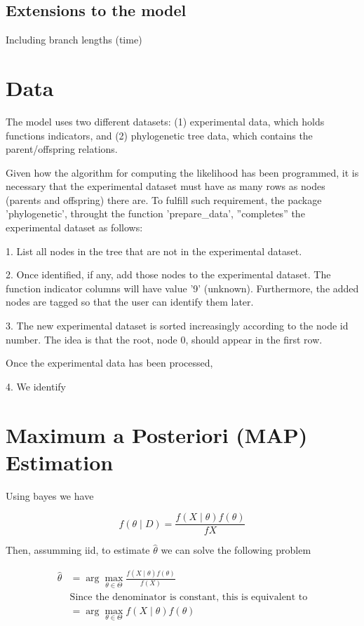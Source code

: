 \documentclass[12pt]{article}
\newcommand{\f}[1]{{f\left(#1\right) }}
\newcommand{\fcond}[2]{{f\left(#1\;|\;#2\right) }}
\begin{document}
\subsection{Extensions to the model}

Including branch lengths (time)

\appendix

\section{Data}

The model uses two different datasets: (1) experimental data, which holds functions indicators, and (2) phylogenetic tree data, which contains the parent/offspring relations.

Given how the algorithm for computing the likelihood has been programmed, it is necessary that the experimental dataset must have as many rows as nodes (parents and offspring) there are. To fulfill such requirement, the package 'phylogenetic', throught the function 'prepare\_data', ''completes'' the experimental dataset as follows:

1.  List all nodes in the tree that are not in the experimental dataset.

2.  Once identified, if any, add those nodes to the experimental dataset. The
    function indicator columns will have value '9' (unknown). Furthermore, the
    added nodes are tagged so that the user can identify them later.
    
3.  The new experimental dataset is sorted increasingly according to the node
    id number. The idea is that the root, node 0, should appear in the
    first row.
    
Once the experimental data has been processed, 
    
4.  We identify

\section{ Maximum a Posteriori (MAP) Estimation}

Using bayes we have

$$
\fcond{\theta}{D} = \frac{\fcond{X}{\theta}\f{\theta}}{f{X}}
$$

Then, assumming iid, to estimate $\hat \theta$ we can solve the following problem

\begin{align*}
\label{eq:maptheta}
\hat \theta & = \arg\max_{\theta \in \Theta} \frac{\fcond{X}{\theta}\f{\theta}}{\f{X}} \\
 & \mbox{Since the denominator is constant, this is equivalent to} \\
 & = \arg\max_{\theta \in \Theta} \fcond{X}{\theta}\f{\theta} \tag{MAP estimate} 
\end{align*}
\end{document}
